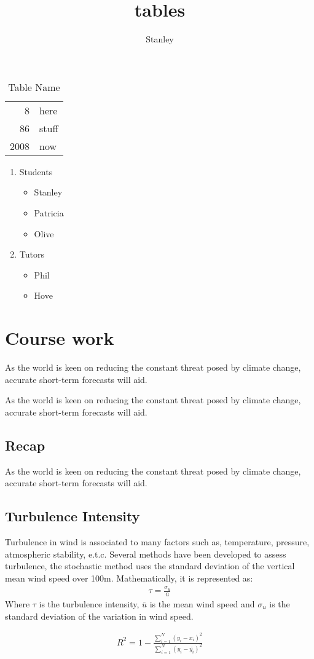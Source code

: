 \documentclass[10pt,a4paper]{article}
\author{Stanley}
\title{tables}
\begin{document}
\begin{table}[h!]
\centering
\begin{tabular}{r l}
\hline
8 & here\\
\cline{2-2}
86 & stuff\\
\hline
\hline
2008 & now\\
\hline

\end{tabular}
\caption{ Table Name}

\end{table}

\begin{enumerate}
\item Students
\begin{itemize}
\item Stanley
\item Patricia
\item Olive
\end{itemize}
\item Tutors
\begin{itemize}
\item Phil
\item Hove
\end{itemize}
\end{enumerate}

\section{Course work}
As the world is keen on reducing the constant threat posed by climate change, accurate short-term forecasts
will aid.

As the world is keen on reducing the constant threat posed by climate change, accurate short-term forecasts
will aid.

\subsection{ Recap} \label{Recap}
As the world is keen on reducing the constant threat posed by climate change, accurate short-term forecasts
will aid.

\subsection{Turbulence Intensity}
Turbulence in wind is associated to many factors such as, temperature, pressure, atmospheric stability, e.t.c. Several methods have been developed to assess turbulence, the stochastic method  uses the standard deviation of the vertical mean wind speed over 100m. Mathematically, it is represented as:
\begin{align}
\tau=\frac{\sigma_{u}}{\bar{u}}
\end{align} 
Where $\tau$ is the turbulence intensity, $\bar{u}$ is the mean wind speed and $\sigma_{u}$ is the standard deviation of the variation in wind speed.


\begin{align}
R^{2}=1-\frac{\sum_{i=1}^{N}(y_{i}-x_{i})^{2}}{\sum_{i=1}^{N}(y_{i}-\bar{y_{i}})^{2}}
\end{align}
\end{document}
